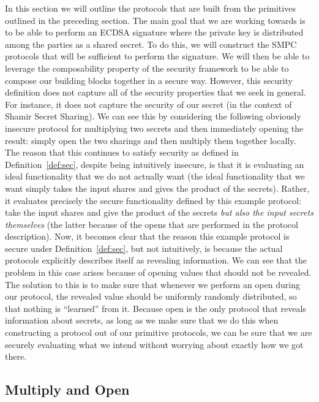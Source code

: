 \documentclass{article}
\theoremstyle{remark}
\begin{document}
In this section we will outline the protocols that are built from the
primitives outlined in the preceding section. The main goal that we are working
towards is to be able to perform an ECDSA signature where the private key is
distributed among the parties as a shared secret. To do this, we will construct
the SMPC protocols that will be sufficient to perform the signature. We will
then be able to leverage the composability property of the security framework
to be able to compose our building blocks together in a secure way. However,
this security definition does not capture all of the security properties that
we seek in general. For instance, it does not capture the security of our
secret (in the context of Shamir Secret Sharing). We can see this by
considering the following obviously insecure protocol for multiplying two
secrets and then immediately opening the result: simply open the two sharings
and then multiply them together locally. The reason that this continues to
satisfy security as defined in Definition~\ref{def:sec}, despite being
intuitively insecure, is that it is evaluating an ideal functionality that we
do not actually want (the ideal functionality that we want simply takes the
input shares and gives the product of the secrets). Rather, it evaluates
precisely the secure functionality defined by this example protocol: take the
input shares and give the product of the secrets \textit{but also the input
secrets themselves} (the latter because of the opens that are performed in the
protocol description). Now, it becomes clear that the reason this example
protocol is secure under Definition~\ref{def:sec}, but not intuitively, is
because the actual protocols explicitly describes itself as revealing
information. We can see that the problem in this case arises because of opening
values that should not be revealed. The solution to this is to make sure that
whenever we perform an open during our protocol, the revealed value should be
uniformly randomly distributed, so that nothing is ``learned'' from it. Because
open is the only protocol that reveals information about secrets, as long as we
make sure that we do this when constructing a protocol out of our primitive
protocols, we can be sure that we are securely evaluating what we intend
without worrying about exactly how we got there.

\subsection{Multiply and Open}
\end{document}
